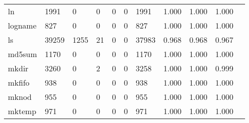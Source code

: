 \begin{longtable}{lp{1.10cm}p{1.10cm}p{1.10cm}p{1.10cm}p{1.10cm}p{1.10cm}p{1.10cm}p{1.10cm}p{1.10cm}p{1.10cm}}
ln        &                   1991 &                                  0 &                                 0 &                                0 &                                 0 &                            1991 &                             1.000 &                                 1.000 &                               1.000 \\
logname   &                    827 &                                  0 &                                 0 &                                0 &                                 0 &                             827 &                             1.000 &                                 1.000 &                               1.000 \\
ls        &                  39259 &                               1255 &                                21 &                                0 &                                 0 &                           37983 &                             0.968 &                                 0.968 &                               0.967 \\
md5sum    &                   1170 &                                  0 &                                 0 &                                0 &                                 0 &                            1170 &                             1.000 &                                 1.000 &                               1.000 \\
mkdir     &                   3260 &                                  0 &                                 2 &                                0 &                                 0 &                            3258 &                             1.000 &                                 1.000 &                               0.999 \\
mkfifo    &                    938 &                                  0 &                                 0 &                                0 &                                 0 &                             938 &                             1.000 &                                 1.000 &                               1.000 \\
mknod     &                    955 &                                  0 &                                 0 &                                0 &                                 0 &                             955 &                             1.000 &                                 1.000 &                               1.000 \\
mktemp    &                    971 &                                  0 &                                 0 &                                0 &                                 0 &                             971 &                             1.000 &                                 1.000 &                               1.000 \\

\end{longtable}
